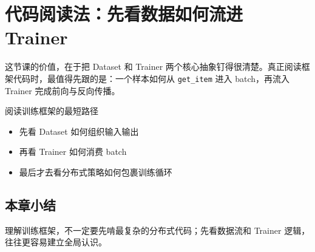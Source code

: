 \section{代码阅读法：先看数据如何流进 Trainer}
这节课的价值，在于把 Dataset 和 Trainer 两个核心抽象钉得很清楚。真正阅读框架代码时，最值得先跟的是：一个样本如何从 \texttt{get\_item} 进入 batch，再流入 Trainer 完成前向与反向传播。

\begin{knowledgebox}{阅读训练框架的最短路径}
\begin{itemize}
  \item 先看 Dataset 如何组织输入输出
  \item 再看 Trainer 如何消费 batch
  \item 最后才去看分布式策略如何包裹训练循环
\end{itemize}
\end{knowledgebox}

\subsection{本章小结}
理解训练框架，不一定要先啃最复杂的分布式代码；先看数据流和 Trainer 逻辑，往往更容易建立全局认识。

\newpage

